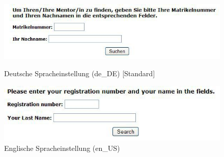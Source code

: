    \begin{figure}[htbp]
	\begin{center}
		\includegraphics[angle={360}, scale=0.61]{pictures/de1.jpg}
	    \caption{Deutsche Spracheinstellung (de\_DE) [Standard]}
	    \label{img:DSDE}
	    	\end{center}
	    	\begin{center}
		\includegraphics[angle={360}, scale=0.61]{pictures/de2.jpg}
	    \caption{Englische Spracheinstellung (en\_US)}
	    \label{img:ESEIN}
	    	\end{center}
   \end{figure} 
\ \newline
\newpage